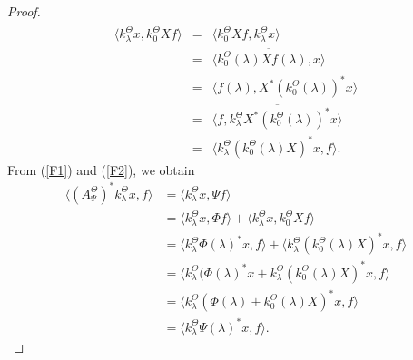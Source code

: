 \documentclass{amsart}
\theoremstyle{definition}
\def\nn{\nonumber}
\def\ben{\begin{eqnarray}}
\def\eeqn{\end{eqnarray}}
\begin{document}
\begin{proof}
\ben \langle k_{\lambda}^{\Theta}x, k_{0}^{\Theta}X f \rangle&=&\overline{\langle k_{0}^{\Theta}X f, k_{\lambda}^{\Theta}x\rangle}\nn\\
&=&\overline{\langle k_{0}^{\Theta}(\lambda)X f(\lambda), x\rangle}\nn\\
&=&\overline{\langle  f(\lambda), X^{*}(k_{0}^{\Theta}(\lambda))^{*}x\rangle}\nn\\
&=&\overline{\langle  f, k_{\lambda}^{\Theta}X^{*}(k_{0}^{\Theta}(\lambda))^{*}x\rangle}\nn\\
&=&\langle  k_{\lambda}^{\Theta}(k_{0}^{\Theta}(\lambda)X)^{*}x, f\rangle.\label{F2}\eeqn
From (\ref{F1}) and (\ref{F2}), we obtain
\begin{align*}
\langle (A_{\Psi}^{\Theta})^{*}k_{\lambda}^{\Theta}x, f \rangle
&=\langle k_{\lambda}^{\Theta}x, \Psi f \rangle\\
&=\langle k_{\lambda}^{\Theta}x, \Phi f \rangle+\langle k_{\lambda}^{\Theta}x, k_{0}^{\Theta}X f \rangle\\
&=\langle k_{\lambda}^{\Theta}\Phi(\lambda)^{*}x, f    \rangle+\langle  k_{\lambda}^{\Theta}(k_{0}^{\Theta}(\lambda)X)^{*}x, f\rangle\\
&=\langle k_{\lambda}^{\Theta}(\Phi(\lambda)^{*}x+k_{\lambda}^{\Theta}(k_{0}^{\Theta}(\lambda)X)^{*}x, f \rangle \\
&=\langle k_{\lambda}^{\Theta}(\Phi(\lambda)+k_{0}^{\Theta}(\lambda)X)^{*}x, f \rangle \\
&=\langle k_{\lambda}^{\Theta}\Psi(\lambda)^{*}x, f \rangle. 
\end{align*}

\end{proof}
\end{document}
